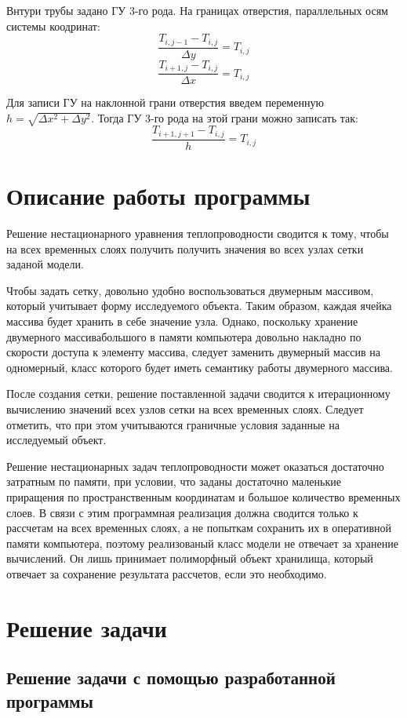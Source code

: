 \documentclass[12pt, a4paper]{article}
\begin{document}
	Внтури трубы задано ГУ 3-го рода.
	На границах отверстия, параллельных осям системы коодринат:
	\[
	\frac{T_{i,j-1} - T_{i,j}}{\Delta y} = T_{i,j}
	\]
	\[
	\frac{T_{i+1,j} - T_{i,j}}{\Delta x} = T_{i,j}
	\]
	
	Для записи ГУ на наклонной грани отверстия введем переменную $h = \sqrt{\Delta x^2 + \Delta y^2}$. Тогда ГУ 3-го рода на этой грани можно записать так:
	\[
	\frac{T_{i+1,j+1} - T_{i,j}}{h} = T_{i,j}
	\]
	
	\section{Описание работы программы}
	
	Решение нестационарного уравнения теплопроводности сводится к тому, чтобы на всех временных слоях получить получить значения во всех узлах сетки заданой модели.
	
	Чтобы задать сетку, довольно удобно воспользоваться двумерным массивом, который учитывает форму исследуемого объекта. Таким образом, каждая ячейка массива будет хранить в себе значение узла. Однако, поскольку хранение двумерного массивабольшого в памяти компьютера довольно накладно по скорости доступа к элементу массива, следует заменить двумерный массив на одномерный, класс которого будет иметь семантику работы двумерного массива.
	
	После создания сетки, решение поставленной задачи сводится к итерационному вычислению значений всех узлов сетки на всех временных слоях. Следует отметить, что при этом учитываются граничные условия заданные на исследуемый объект.
	
	Решение нестационарных задач теплопроводности может оказаться достаточно затратным по памяти, при условии, что заданы достаточно маленькие приращения по пространственным координатам и большое количество временных слоев. В связи с этим программная реализация должна сводится только к рассчетам на всех временных слоях, а не попыткам сохранить их в оперативной памяти компьютера, поэтому реализованый класс модели не отвечает за хранение вычислений. Он лишь принимает полиморфный объект хранилища, который отвечает за сохранение результата рассчетов, если это необходимо.
	
	\section{Решение задачи}
	\subsection{Решение задачи с помощью разработанной программы}
	
\end{document}
